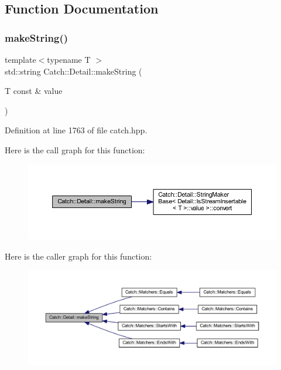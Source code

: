 \subsection{Function Documentation}
\hypertarget{namespace_catch_1_1_detail_aef46b4178e08758524d25d1d969a503c}{}\label{namespace_catch_1_1_detail_aef46b4178e08758524d25d1d969a503c} 
\subsubsection{\texorpdfstring{make\+String()}{makeString()}}
{\footnotesize\ttfamily template$<$typename T $>$ \\
std\+::string Catch\+::\+Detail\+::make\+String (\begin{DoxyParamCaption}\item[{T const \&}]{value }\end{DoxyParamCaption})}



Definition at line 1763 of file catch.\+hpp.

Here is the call graph for this function\+:\nopagebreak
\begin{figure}[H]
\begin{center}
\leavevmode
\includegraphics[width=350pt]{namespace_catch_1_1_detail_aef46b4178e08758524d25d1d969a503c_cgraph}
\end{center}
\end{figure}
Here is the caller graph for this function\+:\nopagebreak
\begin{figure}[H]
\begin{center}
\leavevmode
\includegraphics[width=350pt]{namespace_catch_1_1_detail_aef46b4178e08758524d25d1d969a503c_icgraph}
\end{center}
\end{figure}
\hypertarget{namespace_catch_1_1_detail_ae9a44d574c4fbd18fabaaee05a433d88}{}\label{namespace_catch_1_1_detail_ae9a44d574c4fbd18fabaaee05a433d88} 
